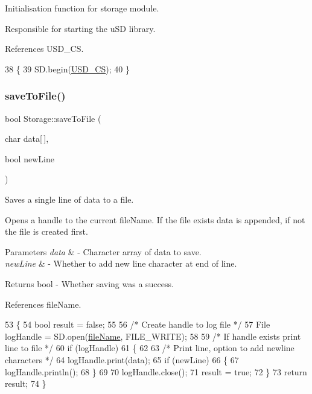 Initialisation function for storage module. 

Responsible for starting the u\+SD library. 

References U\+S\+D\+\_\+\+CS.


\begin{DoxyCode}
38 \{
39   SD.begin(\hyperlink{_storage_8cpp_abe774366dbdfb2de4e34e4f07843db38}{USD\_CS});
40 \}
\end{DoxyCode}
\mbox{\label{class_storage_a044a17325b2917afca49aa19ddb488f6}} 
\subsubsection{\texorpdfstring{save\+To\+File()}{saveToFile()}}
{\footnotesize\ttfamily bool Storage\+::save\+To\+File (\begin{DoxyParamCaption}\item[{char}]{data\mbox{[}$\,$\mbox{]},  }\item[{bool}]{new\+Line }\end{DoxyParamCaption})}



Saves a single line of data to a file. 

Opens a handle to the current file\+Name. If the file exists data is appended, if not the file is created first.


\begin{DoxyParams}{Parameters}
{\em data} & -\/ Character array of data to save. \\
\hline
{\em new\+Line} & -\/ Whether to add new line character at end of line. \\
\hline
\end{DoxyParams}
\begin{DoxyReturn}{Returns}
bool -\/ Whether saving was a success. 
\end{DoxyReturn}


References file\+Name.


\begin{DoxyCode}
53 \{
54   \textcolor{keywordtype}{bool} result = \textcolor{keyword}{false};
55 
56   \textcolor{comment}{/* Create handle to log file */}
57   File logHandle = SD.open(\hyperlink{class_storage_a7c3e886a0b8395c2045ab4f7e04481e1}{fileName}, FILE\_WRITE);
58 
59   \textcolor{comment}{/* If handle exists print line to file */}
60   \textcolor{keywordflow}{if} (logHandle)
61   \{
62 
63     \textcolor{comment}{/* Print line, option to add newline characters */}
64     logHandle.print(data);
65     \textcolor{keywordflow}{if} (newLine)
66     \{
67       logHandle.println();
68     \}
69 
70     logHandle.close();
71     result = \textcolor{keyword}{true};
72   \}
73   \textcolor{keywordflow}{return} result;
74 \}
\end{DoxyCode}
\mbox{\label{class_storage_a571ce9630665d9407ffbaeff55c47b0a}} 

